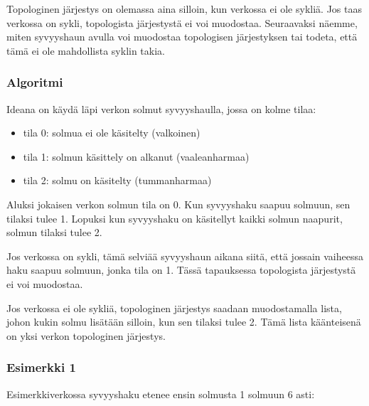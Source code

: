 Topologinen järjestys on olemassa
aina silloin, kun verkossa ei ole sykliä.
Jos taas verkossa on sykli,
topologista järjestystä ei voi muodostaa.
Seuraavaksi näemme, miten syvyyshaun avulla
voi muodostaa topologisen järjestyksen tai
todeta, että tämä ei ole mahdollista syklin takia.

\subsubsection{Algoritmi}

Ideana on käydä läpi verkon solmut syvyyshaulla,
jossa on kolme tilaa:

\begin{itemize}
\item tila 0: solmua ei ole käsitelty (valkoinen)
\item tila 1: solmun käsittely on alkanut (vaaleanharmaa)
\item tila 2: solmu on käsitelty (tummanharmaa)
\end{itemize}

Aluksi jokaisen verkon solmun tila on 0.
Kun syvyyshaku saapuu solmuun, sen tilaksi tulee 1.
Lopuksi kun syvyyshaku on käsitellyt kaikki
solmun naapurit, solmun tilaksi tulee 2.

Jos verkossa on sykli, tämä selviää syvyyshaun aikana siitä,
että jossain vaiheessa haku saapuu solmuun,
jonka tila on 1. Tässä tapauksessa topologista
järjestystä ei voi muodostaa.

Jos verkossa ei ole sykliä, topologinen järjestys
saadaan muodostamalla lista, johon kukin solmu lisätään
silloin, kun sen tilaksi tulee 2.
Tämä lista käänteisenä on yksi verkon
topologinen järjestys.

\subsubsection{Esimerkki 1}

Esimerkkiverkossa syvyyshaku etenee ensin solmusta 1
solmuun 6 asti:

\begin{center}
\end{center}

